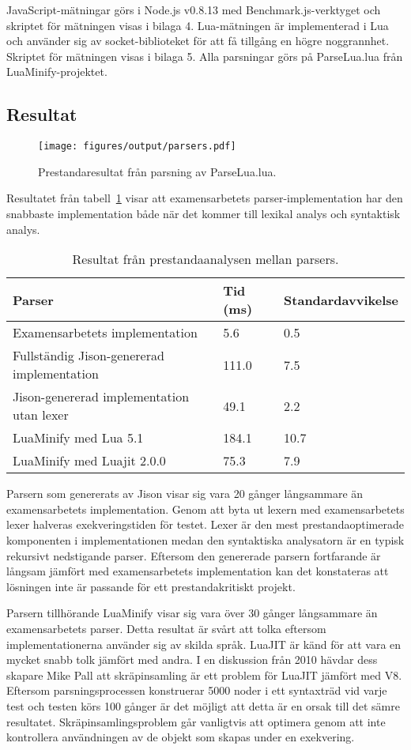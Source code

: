 JavaScript-mätningar görs i Node.js v0.8.13 med Benchmark.js-verktyget och
skriptet för mätningen visas i bilaga 4. Lua-mätningen är implementerad i Lua
och använder sig av socket-biblioteket för att få tillgång en högre
noggrannhet. Skriptet för mätningen visas i bilaga 5. Alla parsningar görs på
ParseLua.lua från LuaMinify-projektet.

\subsection{Resultat}

\begin{figure}[ht]
  \texttt{[image: figures/output/parsers.pdf]}
  \caption{Prestandaresultat från parsning av ParseLua.lua.}
\end{figure}

Resultatet från tabell~\ref{tab:parsers} visar att examensarbetets
parser-implementation har den snabbaste implementation både när det kommer
till lexikal analys och syntaktisk analys.

\begin{table}[ht]
  \caption{Resultat från prestandaanalysen mellan parsers.}
  \begin{tabular}{l l l}
    Parser & Tid (ms) & Standardavvikelse \\
    \hline
    Examensarbetets implementation & 5.6 & 0.5 \\
    Fullständig Jison-genererad implementation & 111.0 & 7.5 \\
    Jison-genererad implementation utan lexer & 49.1 & 2.2 \\
    LuaMinify med Lua 5.1 & 184.1 & 10.7 \\
    LuaMinify med Luajit 2.0.0 & 75.3 & 7.9
  \end{tabular}
  \label{tab:parsers}
\end{table}


Parsern som genererats av Jison visar sig vara 20 gånger långsammare än
examensarbetets implementation.  Genom att byta ut lexern med examensarbetets
lexer halveras exekveringstiden för testet. Lexer är den mest
prestandaoptimerade komponenten i implementationen medan den syntaktiska
analysatorn är en typisk rekursivt nedstigande parser. Eftersom den
genererade parsern fortfarande är långsam jämfört med examensarbetets
implementation kan det konstateras att lösningen inte är passande för ett
prestandakritiskt projekt.

Parsern tillhörande LuaMinify visar sig vara över 30 gånger långsammare än
examensarbetets parser. Detta resultat är svårt att tolka eftersom
implementationerna använder sig av skilda språk. LuaJIT är känd för att vara
en mycket snabb tolk jämfört med andra. I en diskussion från 2010 hävdar dess
skapare Mike Pall \citep{mp10} att skräpinsamling är ett problem för LuaJIT
jämfört med V8. Eftersom parsningsprocessen konstruerar 5000 noder i ett
syntaxträd vid varje test och testen körs 100 gånger är det möjligt att detta
är en orsak till det sämre resultatet. Skräpinsamlingsproblem går vanligtvis
att optimera genom att inte kontrollera användningen av de objekt som skapas
under en exekvering.

